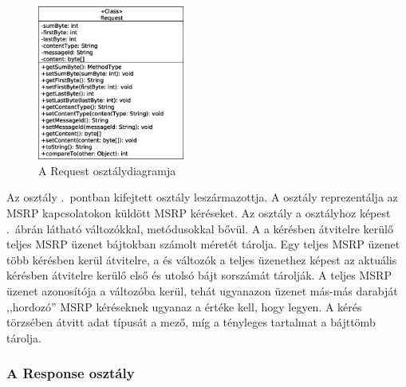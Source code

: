 \begin{figure}
  \vspace{-15pt}
  \begin{center}
    \includegraphics[width=0.43\textwidth]{img/class_diagrams/Request.eps}
  \end{center}
  \vspace{-15pt}
  \captionsetup{font=scriptsize}
  \caption{A Request osztálydiagramja}
   \label{fig:class_request}
  \vspace{-10pt}
\end{figure}
Az osztály .~pontban kifejtett  osztály leszármazottja. A  osztály reprezentálja az MSRP kapcsolatokon küldött MSRP kéréseket. Az osztály a  osztályhoz képest .~ábrán látható változókkal, metódusokkal bővül. A  a kérésben átvitelre kerülő teljes MSRP üzenet bájtokban számolt méretét tárolja. Egy teljes MSRP üzenet több kérésben kerül átvitelre, a  és  változók a teljes üzenethez képest az aktuális kérésben átvitelre kerülő első és utolsó bájt sorszámát tárolják. A teljes MSRP üzenet azonosítója a  változóba kerül, tehát ugyanazon üzenet más-más darabját ,,hordozó'' MSRP kéréseknek ugyanaz a  értéke kell, hogy legyen. A kérés törzsében átvitt adat típusát a  mező, míg a tényleges tartalmat a  bájttömb tárolja. 

\subsubsection*{A Response osztály}
\label{sec:msrp_response}

